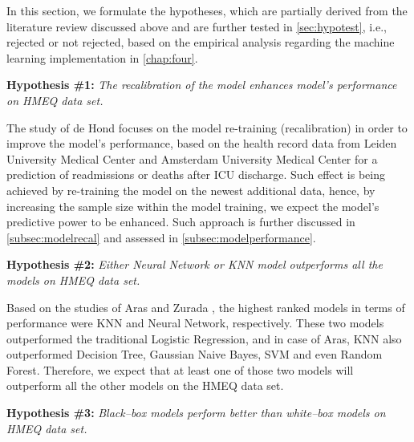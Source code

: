 In this section, we formulate the hypotheses, which are partially derived from the literature review discussed above and are further tested in \autoref{sec:hypotest}, i.e., rejected or not rejected, based on the empirical analysis regarding the machine learning implementation in \autoref{chap:four}.
\vspace{0.5cm}

\noindent \textbf{Hypothesis \#1:} \textit{The recalibration of the model enhances model's performance on HMEQ data set.}

The study of de Hond \citep{de2023predicting} focuses on the model re-training (recalibration) in order to improve the model's performance, based on the health record data from Leiden University Medical Center and Amsterdam University Medical Center for a prediction of readmissions or deaths after ICU discharge.
Such effect is being achieved by re-training the model on the newest additional data, hence, by increasing the sample size within the model training, we expect the model's predictive power to be enhanced. Such approach is further discussed in \autoref{subsec:modelrecal} and assessed in \autoref{subsec:modelperformance}.
\vspace{0.5cm}


\noindent \textbf{Hypothesis \#2:} \textit{Either Neural Network or KNN model outperforms all the models on HMEQ data set.}

Based on the studies of Aras \citep{serkan2021bagging} and Zurada \citep{zurada2014classification}, the highest ranked models in terms of performance were KNN and Neural Network, respectively. These two models outperformed the traditional Logistic Regression, and in case of Aras, KNN also outperformed Decision Tree, Gaussian Naive Bayes, SVM and even Random Forest.
Therefore, we expect that at least one of those two models will outperform all the other models on the HMEQ data set.

\vspace{0.5cm}

\noindent \textbf{Hypothesis \#3:} \textit{Black--box models perform better than white--box models on HMEQ data set.}

